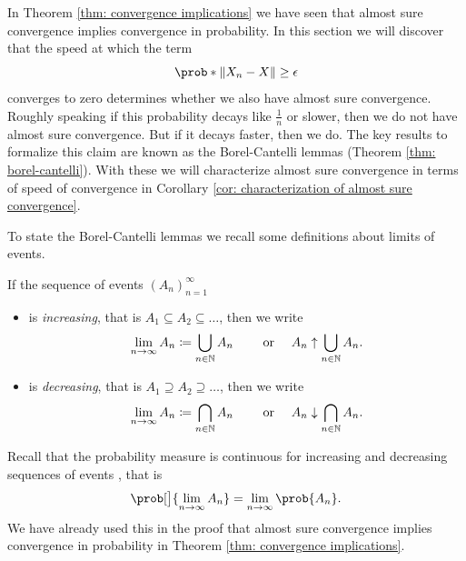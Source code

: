 In Theorem \ref{thm: convergence implications} we have
seen that almost sure convergence implies convergence in probability. In this
section we will discover that the speed at which the term
\begin{equation*}
    \prob*{\norm{X_n - X} \ge \epsilon}
\end{equation*}
converges to zero determines whether we also have almost sure convergence.
Roughly speaking if this probability decays like \(\frac1n\) or slower, then
we do not have almost sure convergence. But if it decays faster, then we do.
The key results to formalize this claim are known as the Borel-Cantelli lemmas
(Theorem \ref{thm: borel-cantelli}). With these we will characterize almost sure
convergence in terms of speed of convergence in Corollary \ref{cor:
characterization of almost sure convergence}.

To state the Borel-Cantelli lemmas we recall some definitions about limits of
events.

\begin{definition}
    If the sequence of events \((A_n)_{n=1}^\infty\) 
    \begin{itemize}
        \item is \emph{increasing}, that is \(A_1\subseteq A_2\subseteq \ldots\),
        then we write
        \[
            \lim_{n\to \infty} A_n \coloneq \bigcup_{n\in \mathbb{N}} A_n
            \qquad \text{ or } \quad A_n \uparrow \bigcup_{n\in \mathbb{N}} A_n.
        \]
        \item is \emph{decreasing}, that is \(A_1\supseteq A_2\supseteq \ldots\),
        then we write
        \[
            \lim_{n\to \infty} A_n \coloneq \bigcap_{n\in \mathbb{N}} A_n
            \qquad \text{ or } \quad A_n \downarrow \bigcap_{n\in \mathbb{N}} A_n.
        \]
    \end{itemize}
\end{definition}

\begin{remark}
    \label{rem: continuity of probability}
    Recall that the probability measure is continuous for increasing and decreasing
    sequences of events \continuityOfMeasure, that is
    \begin{equation}
        \label{eq: continuity of probability}
        \prob[\big]{\lim_{n\to \infty} A_n}
        = \lim_{n\to \infty} \prob{A_n}.
    \end{equation}
    We have already used this in the proof that almost sure convergence implies
    convergence in probability in Theorem \ref{thm: convergence implications}.
\end{remark}

